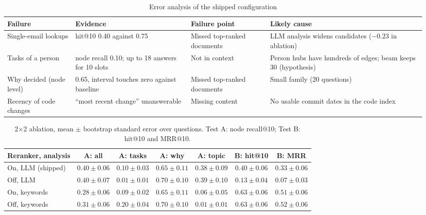 \documentclass[12pt,onecolumn,draftclsnofoot]{IEEEtran}
\begin{document}
\begin{table}[t]
\centering
\caption{Error analysis of the shipped configuration}
\label{tab:failures}
\footnotesize
\begin{tabularx}{\textwidth}{@{}>{\raggedright\arraybackslash}p{3.1cm}Y>{\raggedright\arraybackslash}p{3.2cm}Y@{}}
\toprule
Failure & Evidence & Failure point \cite{barnett2024failure} & Likely cause \\
\midrule
Single-email lookups & hit@10 0.40 against 0.75 & Missed top-ranked documents & LLM analysis widens candidates ($-0.23$ in ablation) \\
Tasks of a person & node recall 0.10; up to 18 answers for 10 slots & Not in context & Person hubs have hundreds of edges; beam keeps 30 (hypothesis) \\
Why decided (node level) & 0.65, interval touches zero against baseline & Missed top-ranked documents & Small family (20 questions) \\
Recency of code changes & ``most recent change'' unanswerable & Missing content & No usable commit dates in the code index \\
\bottomrule
\end{tabularx}
\end{table}

\begin{table}[t]
\centering
\caption{2$\times$2 ablation, mean $\pm$ bootstrap standard error over questions. Test A: node recall@10; Test B: hit@10 and MRR@10.}
\label{tab:ablation}
\scriptsize
\setlength{\tabcolsep}{3pt}
\begin{tabular}{@{}lcccccc@{}}
\toprule
Reranker, analysis & A: all & A: tasks & A: why & A: topic & B: hit@10 & B: MRR \\
\midrule
On, LLM (shipped) & $\mathbf{0.40} \pm 0.06$ & $0.10 \pm 0.03$ & $0.65 \pm 0.11$ & $0.38 \pm 0.09$ & $0.40 \pm 0.06$ & $0.33 \pm 0.06$ \\
Off, LLM & $\mathbf{0.40} \pm 0.07$ & $0.01 \pm 0.01$ & $\mathbf{0.70} \pm 0.10$ & $\mathbf{0.39} \pm 0.10$ & $0.13 \pm 0.04$ & $0.07 \pm 0.03$ \\
On, keywords & $0.28 \pm 0.06$ & $0.09 \pm 0.02$ & $0.65 \pm 0.11$ & $0.06 \pm 0.05$ & $\mathbf{0.63} \pm 0.06$ & $0.51 \pm 0.06$ \\
Off, keywords & $0.31 \pm 0.06$ & $\mathbf{0.20} \pm 0.04$ & $\mathbf{0.70} \pm 0.10$ & $0.01 \pm 0.01$ & $\mathbf{0.63} \pm 0.06$ & $\mathbf{0.52} \pm 0.06$ \\
\bottomrule
\end{tabular}
\end{table}
\end{document}
